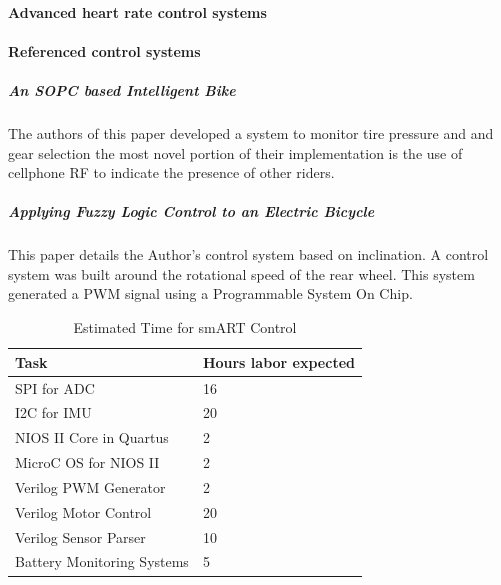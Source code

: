 \documentclass[12pt,article]{IEEEtran}
\begin{document}
		\paragraph{\bfseries Advanced heart rate control systems}
		
	
	\paragraph{\bfseries Referenced control systems}
		\subparagraph{An SOPC based Intelligent Bike}	
			The authors of this paper developed a system to monitor tire pressure and and gear selection
			the most novel portion of their implementation is the use of cellphone RF to indicate the
			presence of other riders. \cite{SOPCBike}
			
		\subparagraph{Applying Fuzzy Logic Control to an Electric Bicycle}
			This paper details the Author's control system based on inclination. A control system
			was built around the rotational speed of the rear wheel. This system generated a PWM
			signal using a Programmable System On Chip.\cite{FuzzyLogicControl}
            
    \begin{table}[H]    	
        \renewcommand{\arraystretch}{1.3}
    			\caption{Estimated Time for smART Control}
    			
    			\label{Estimated Time}
    			
    			\centering
    			\begin{tabular}{p{6cm}|p{1.6cm}}
    			\hline
    			\bfseries 	Task 			        	& \bfseries Hours labor expected     		   \\
    			\hline\hline
    						SPI for ADC 		        & 16						    	            \\
    						I2C for IMU    	        	& 20			                                \\	
    						NIOS II Core in Quartus	    & 2				                                \\	
    						MicroC OS for NIOS II   	& 2				                                \\
                            Verilog PWM Generator       & 2						                        \\
    						Verilog Motor Control    	& 20                             \\	
    						Verilog Sensor Parser    	& 10		\\
							Battery Monitoring Systems	& 5       \\	
    					    \hline
    			\end{tabular}
		\end{table}
	
\end{document}
